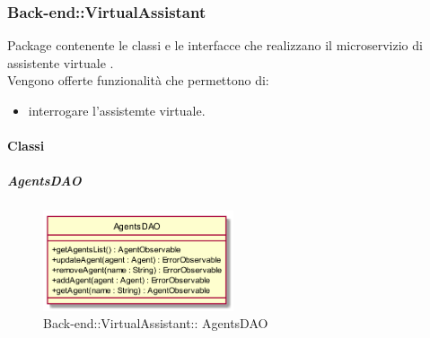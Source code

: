 \subsubsection{Back-end::VirtualAssistant}
Package contenente le classi e le interfacce che realizzano il microservizio di assistente virtuale .\\
Vengono offerte funzionalità che permettono di:
\begin{itemize}
	\item interrogare l'assistemte virtuale.
\end{itemize}

\paragraph{Classi}
\hypertarget{ AgentsDAO_label}{\subparagraph{ AgentsDAO}}
\begin{figure}[h]
	\centering
	\includegraphics[width=0.50\textwidth,height=\textheight,keepaspectratio]{images/ClassAgentsDAO.png}
	\caption{Back-end::VirtualAssistant:: AgentsDAO}
\end{figure}
